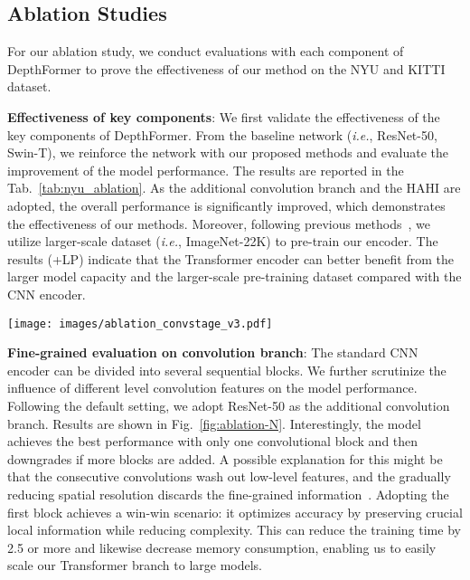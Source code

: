 \documentclass[twocolumn]{svjour3}    \pdfoutput=1
\begin{document}
\subsection{Ablation Studies}
For our ablation study, we conduct evaluations with each component of DepthFormer to prove the effectiveness of our method on the NYU and KITTI dataset.

\textbf{Effectiveness of key components}:
We first validate the effectiveness of the key components of DepthFormer. From the baseline network (\textit{i.e.}, ResNet-50, Swin-T), we reinforce the network with our proposed methods and evaluate the improvement of the model performance. The results are reported in the Tab.~\ref{tab:nyu_ablation}. As the additional convolution branch and the HAHI are adopted, the overall performance is significantly improved, which demonstrates the effectiveness of our methods. Moreover, following previous methods~\citep{yang2021transdepth, ranftl2021dpt}, we utilize larger-scale dataset (\textit{i.e.}, ImageNet-22K) to pre-train our encoder. The results (+LP) indicate that the Transformer encoder can better benefit from the larger model capacity and the larger-scale pre-training dataset compared with the CNN encoder.


\begin{figure*}
    \centering
    \texttt{[image: images/ablation\_convstage\_v3.pdf]}
    \caption{Effect of the convolution branch block on NYU depth estimation performance. We can observe that behaviour decreases after the first block of R-50~\citep{he2016resenet}.}
    \label{fig:ablation-N}
\end{figure*}


\textbf{Fine-grained evaluation on convolution branch}:
The standard CNN encoder can be divided into several sequential blocks. We further scrutinize the influence of different level convolution features on the model performance. Following the default setting, we adopt ResNet-50 as the additional convolution branch. Results are shown in Fig.~\ref{fig:ablation-N}. Interestingly, the model achieves the best performance with only one convolutional block and then downgrades if more blocks are added. A possible explanation for this might be that the consecutive convolutions wash out low-level features, and the gradually reducing spatial resolution discards the fine-grained information~\citep{yang2021transdepth}. Adopting the first block achieves a win-win scenario: it optimizes accuracy by preserving crucial local information while reducing complexity. This can reduce the training time by 2.5 or more and likewise decrease memory consumption, enabling us to easily scale our Transformer branch to large models.
\end{document}

